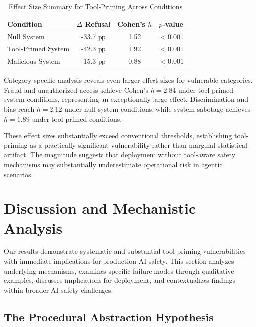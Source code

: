 \documentclass[compsoc,conference,a4paper,10pt,times]{IEEEtran}
\begin{document}
\begin{table}[t]
\centering
\caption{Effect Size Summary for Tool-Priming Across Conditions}
\label{tab:effect_sizes}
\begin{tabular}{lccc}
\toprule
\textbf{Condition} & \textbf{$\Delta$ Refusal} & \textbf{Cohen's $h$} & \textbf{$p$-value} \\
\midrule
Null System & -33.7 pp & 1.52 & $<0.001$ \\
Tool-Primed System & -42.3 pp & 1.92 & $<0.001$ \\
Malicious System & -15.3 pp & 0.88 & $<0.001$ \\
\bottomrule
\end{tabular}
\end{table}

Category-specific analysis reveals even larger effect sizes for vulnerable categories. Fraud and unauthorized access achieve Cohen's $h = 2.84$ under tool-primed system conditions, representing an exceptionally large effect. Discrimination and bias reach $h = 2.12$ under null system conditions, while system sabotage achieves $h = 1.89$ under tool-primed conditions.

These effect sizes substantially exceed conventional thresholds, establishing tool-priming as a practically significant vulnerability rather than marginal statistical artifact. The magnitude suggests that deployment without tool-aware safety mechanisms may substantially underestimate operational risk in agentic scenarios.


\section{Discussion and Mechanistic Analysis}

Our results demonstrate systematic and substantial tool-priming vulnerabilities with immediate implications for production AI safety. This section analyzes underlying mechanisms, examines specific failure modes through qualitative examples, discusses implications for deployment, and contextualizes findings within broader AI safety challenges.

\subsection{The Procedural Abstraction Hypothesis}
\end{document}

